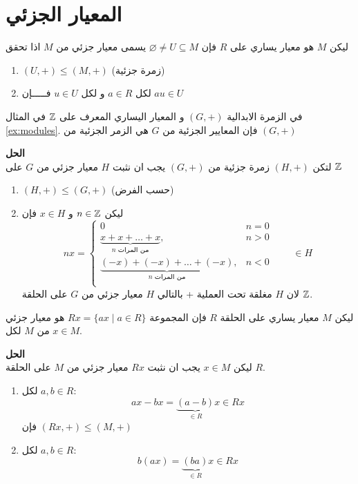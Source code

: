 \section{المعيار الجزئي}
\begin{definition}
  ليكن $M$ هو معيار يساري على $R$ فإن $\varnothing\neq U\subseteq M$ يسمى معيار جزئي من $M$ اذا تحقق
  \begin{enumerate}
  	\item $(U, +) \leq (M, +)$ (زمرة جزئية)
  	\item  لكل $a\in R$ و لكل $u\in U$ فـــــإن $au\in U$
  \end{enumerate}
\end{definition}

\begin{example}\label{ex:submodules}
	في الزمرة الابدالية $(G,+)$ و المعيار اليساري المعرف على $\mathbb{Z}$ في المثال \ref{ex:modules}. فإن المعايير الجزئية من $G$ هي الزمر الجزئية من $(G,+)$
	\end{example}
	\noindent
	\textbf{الحل}\\
	\noindent
	لتكن $(H,+)$ زمرة جزئية من $(G,+)$ يجب ان نثبت $H$ معيار جزئي من $G$ على $\mathbb{Z}$  
	\begin{enumerate}
		\item $(H, +) \leq (G, +)$ (حسب الفرض)
		\item ليكن $n\in\mathbb{Z}$ و $x\in H$ فإن 
		\[
		nx = 
		\begin{cases}
			0 & n=0 \\
			\underbrace{x+x+\dots+x}_{\text{$n$ من المرات}}, & n>0\\
			\underbrace{(-x)+(-x)+\dots+(-x)}_{\text{$n$ من المرات}}, & n<0\\
		\end{cases}
		\qquad \in H
		\]
		لان $H$ مغلقة تحت العملية + بالتالي $H$ معيار جزئي من $G$ على الحلقة $\mathbb{Z}$.
	\end{enumerate}

	\begin{example}
		 ليكن $M$ معيار يساري على الحلقة $R$ فإن المجموعة $Rx=\{ax\mid a\in R\}$ هو معيار جزئي من $M$ لكل $x\in M$.
	\end{example}
	\noindent
	\textbf{الحل}\\
	\noindent
	ليكن $x\in M$ يجب ان نثبت $Rx$ معيار جزئي من $M$ على الحلقة $R$.
	\begin{enumerate}
		\item لكل $a,b\in R$:
		\[
		ax - bx = \underbrace{(a-b)}_{\in R} x \in Rx
		\]
		فإن $(Rx,+)\leq (M,+)$
		\item لكل $a,b\in R$:
		\[
		b(ax) = \underbrace{(ba)}_{\in R}x \in Rx
		\]
	\end{enumerate}



